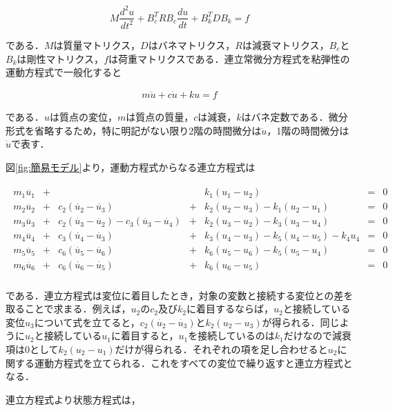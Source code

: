 \begin{equation}
    M \frac{d^2 u}{dt^2} + B_c^T R B_c \frac{du}{dt} + B_k^T D B_k = f    
\end{equation}

である．$M$は質量マトリクス，$D$はバネマトリクス，$R$は減衰マトリクス，$B_c$と$B_k$は剛性マトリクス，$f$は荷重マトリクスである．連立常微分方程式を粘弾性の運動方程式で一般化すると

\begin{eqnarray}
    m\ddot{u} + c\dot{u} + ku = f
\end{eqnarray}

である．$u$は質点の変位，$m$は質点の質量，$c$は減衰，$k$はバネ定数である．微分形式を省略するため，特に明記がない限り2階の時間微分は$\ddot{u}$，1階の時間微分は$\dot{u}$で表す．

図\ref{fig:簡易モデル}より，運動方程式からなる連立方程式は

\begin{eqnarray}
    \begin{matrix}
        m_1 \ddot{u_1} &+&  & & k_1 (u_1 - u_2) &=& 0 \\ 
        m_2 \ddot{u_2} &+& c_2(\dot{u_2} - \dot{u_3}) &+& k_2 (u_2 - u_3) - k_1 (u_2 - u_1) &=& 0 \\ 
        m_3 \ddot{u_3} &+& c_2(\dot{u_3} - \dot{u_2}) - c_3(\dot{u_3} - \dot{u_4}) &+& k_2 (u_3 - u_2) - k_3 (u_3 - u_4) &=& 0 \\ 
        m_4 \ddot{u_4} &+& c_3(\dot{u_4} - \dot{u_3}) &+& k_3 (u_4 - u_3) - k_5 (u_4 - u_5) - k_4 u_4 &=& 0 \\ 
        m_5 \ddot{u_5} &+& c_6(\dot{u_5} - \dot{u_6}) &+& k_6 (u_5 - u_6) - k_5 (u_5 - u_4) &=& 0 \\
        m_6 \ddot{u_6} &+& c_6(\dot{u_6} - \dot{u_5}) &+& k_6 (u_6 - u_5) &=& 0 \\
    \end{matrix}        
\end{eqnarray}

である．連立方程式は変位に着目したとき，対象の変数と接続する変位との差を取ることで求まる．例えば，$u_2$の$c_2$及び$k_2$に着目するならば，$u_2$と接続している変位$u_3$について式を立てると，$c_2(\dot{u_2} - \dot{u_3})$と$k_2(u_2 - u_3)$が得られる．同じように$u_2$と接続している$u_1$に着目すると，$u_1$を接続しているのは$k_1$だけなので減衰項は$0$として$k_2(u_2 - u_1)$だけが得られる．それぞれの項を足し合わせると$u_2$に関する運動方程式を立てられる．これをすべての変位で繰り返すと連立方程式となる．

連立方程式より状態方程式は，

